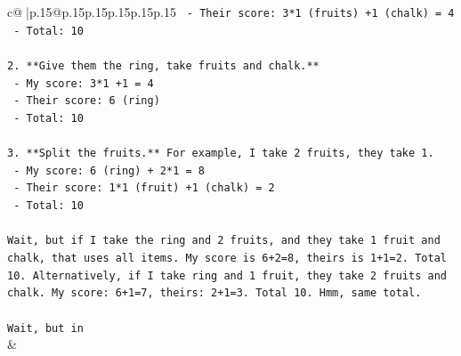 \documentclass{article}
\begin{document}
{\begin{supertabular}{c@{$\;$}|p{.15\linewidth}@{}p{.15\linewidth}p{.15\linewidth}p{.15\linewidth}p{.15\linewidth}p{.15\linewidth}}
{{{\texttt{   {-} Their score: 3*1 (fruits) +1 (chalk) = 4} \\
\texttt{   {-} Total: 10} \\
\\ 
\texttt{2. **Give them the ring, take fruits and chalk.**} \\
\texttt{   {-} My score: 3*1 +1 = 4} \\
\texttt{   {-} Their score: 6 (ring)} \\
\texttt{   {-} Total: 10} \\
\\ 
\texttt{3. **Split the fruits.** For example, I take 2 fruits, they take 1.} \\
\texttt{   {-} My score: 6 (ring) + 2*1 = 8} \\
\texttt{   {-} Their score: 1*1 (fruit) +1 (chalk) = 2} \\
\texttt{   {-} Total: 10} \\
\\ 
\texttt{Wait, but if I take the ring and 2 fruits, and they take 1 fruit and chalk, that uses all items. My score is 6+2=8, theirs is 1+1=2. Total 10. Alternatively, if I take ring and 1 fruit, they take 2 fruits and chalk. My score: 6+1=7, theirs: 2+1=3. Total 10. Hmm, same total.} \\
\\ 
\texttt{Wait, but in} \\
            }
        }
    }
    & \\ \\


\end{supertabular}}
\end{document}

